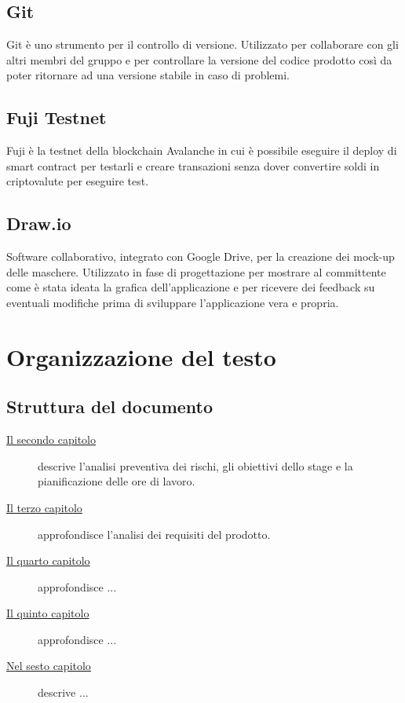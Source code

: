 \subsection*{Git}
Git è uno strumento per il controllo di versione. Utilizzato per collaborare con gli altri membri del gruppo e per controllare la versione del codice prodotto così da poter ritornare ad una versione stabile in caso di problemi.

\subsection*{Fuji Testnet}
Fuji è la testnet della blockchain Avalanche in cui è possibile eseguire il deploy di smart contract per testarli e creare transazioni senza dover convertire soldi in criptovalute per eseguire test.

\subsection*{Draw.io}
Software collaborativo, integrato con Google Drive, per la creazione dei mock-up delle maschere. Utilizzato in fase di progettazione per mostrare al committente come è stata ideata la grafica dell’applicazione e per ricevere dei feedback su eventuali modifiche prima di sviluppare l’applicazione vera e propria.

\section{Organizzazione del testo}
\subsection{Struttura del documento}
\begin{description}

    \item[{\hyperref[cap:descrizione-stage]{Il secondo capitolo}}] descrive l’analisi preventiva dei rischi, gli obiettivi dello stage e la pianificazione delle ore di lavoro.
    
    \item[{\hyperref[cap:analisi-requisiti]{Il terzo capitolo}}] approfondisce l'analisi dei requisiti del prodotto.
    
    \item[{\hyperref[cap:progettazione-codifica]{Il quarto capitolo}}] approfondisce ...
    
    \item[{\hyperref[cap:verifica-validazione]{Il quinto capitolo}}] approfondisce ...
    
    \item[{\hyperref[cap:conclusioni]{Nel sesto capitolo}}] descrive ...
\end{description}

